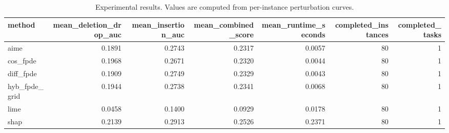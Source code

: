 \begin{table}[t]
\caption{Experimental results. Values are computed from per-instance perturbation curves.}
\label{tab:main_results_computed}
\centering
\begin{tabular}{lrrrrrr}
\toprule
method & mean\_deletion\_drop\_auc & mean\_insertion\_auc & mean\_combined\_score & mean\_runtime\_seconds & completed\_instances & completed\_tasks \\
\midrule
aime & 0.1891 & 0.2743 & 0.2317 & 0.0057 & 80 & 1 \\
cos\_fpde & 0.1968 & 0.2671 & 0.2320 & 0.0044 & 80 & 1 \\
diff\_fpde & 0.1909 & 0.2749 & 0.2329 & 0.0043 & 80 & 1 \\
hyb\_fpde\_grid & 0.1944 & 0.2738 & 0.2341 & 0.0068 & 80 & 1 \\
lime & 0.0458 & 0.1400 & 0.0929 & 0.0178 & 80 & 1 \\
shap & 0.2139 & 0.2913 & 0.2526 & 0.2371 & 80 & 1 \\
\bottomrule
\end{tabular}

\end{table}
